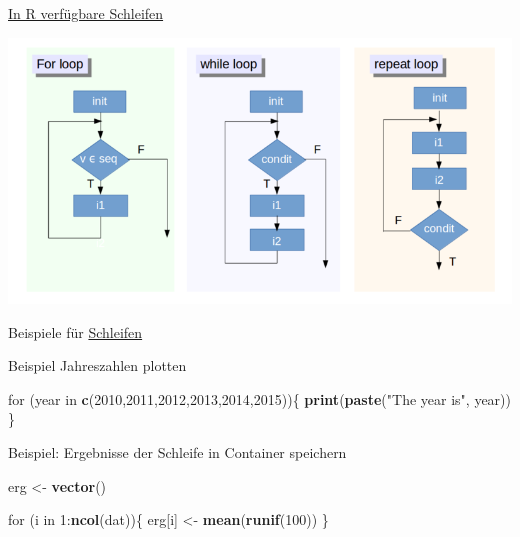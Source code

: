 \documentclass[ignorenonframetext,]{beamer}
\newenvironment{Shaded}{}{}
\newcommand{\KeywordTok}[1]{\textcolor[rgb]{0.00,0.44,0.13}{\textbf{{#1}}}}
\newcommand{\DecValTok}[1]{\textcolor[rgb]{0.25,0.63,0.44}{{#1}}}
\newcommand{\StringTok}[1]{\textcolor[rgb]{0.25,0.44,0.63}{{#1}}}
\newcommand{\NormalTok}[1]{{#1}}
\begin{document}
\begin{frame}{\href{https://www.datacamp.com/community/tutorials/tutorial-on-loops-in-r\#gs.e=BY75k}{In
R verfügbare Schleifen}}

\includegraphics{./tex2pdf.956/645ce298d09f8b6a04c4b9ecab4d619cedfffc6d.png}

\end{frame}

\begin{frame}[fragile]{Beispiele für
\href{https://www.r-bloggers.com/how-to-write-the-first-for-loop-in-r/}{Schleifen}}

\begin{block}{Beispiel Jahreszahlen plotten}

\begin{Shaded}
\begin{Highlighting}[]
\NormalTok{for (year in }\KeywordTok{c}\NormalTok{(}\DecValTok{2010}\NormalTok{,}\DecValTok{2011}\NormalTok{,}\DecValTok{2012}\NormalTok{,}\DecValTok{2013}\NormalTok{,}\DecValTok{2014}\NormalTok{,}\DecValTok{2015}\NormalTok{))\{}
  \KeywordTok{print}\NormalTok{(}\KeywordTok{paste}\NormalTok{(}\StringTok{"The year is"}\NormalTok{, year))}
\NormalTok{\}}
\end{Highlighting}
\end{Shaded}

\end{block}

\begin{block}{Beispiel: Ergebnisse der Schleife in Container speichern}

\begin{Shaded}
\begin{Highlighting}[]
\NormalTok{erg <-}\StringTok{ }\KeywordTok{vector}\NormalTok{()}

\NormalTok{for (i in }\DecValTok{1}\NormalTok{:}\KeywordTok{ncol}\NormalTok{(dat))\{}
  \NormalTok{erg[i] <-}\StringTok{ }\KeywordTok{mean}\NormalTok{(}\KeywordTok{runif}\NormalTok{(}\DecValTok{100}\NormalTok{))}
\NormalTok{\}}
\end{Highlighting}
\end{Shaded}

\end{block}

\end{frame}
\end{document}
